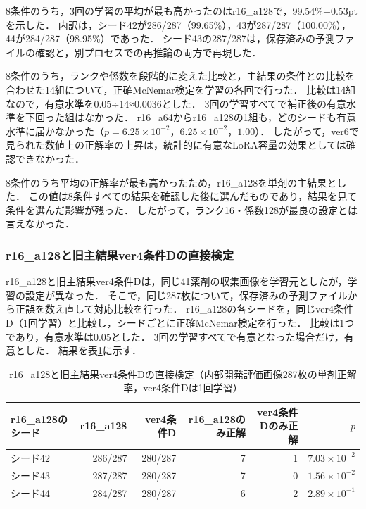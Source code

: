 \documentclass[uplatex,dvipdfmx]{jsarticle}
\begin{document}
8条件のうち，3回の学習の平均が最も高かったのはr16\_a128で，99.54\%$\pm$0.53ptを示した．
内訳は，シード42が286/287（99.65\%），43が287/287（100.00\%），44が284/287（98.95\%）であった．
シード43の287/287は，保存済みの予測ファイルの確認と，別プロセスでの再推論の両方で再現した．

8条件のうち，ランクや係数を段階的に変えた比較と，主結果の条件との比較を合わせた14組について，正確McNemar検定を学習の各回で行った．
比較は14組なので，有意水準を0.05÷14≈0.0036とした．
3回の学習すべてで補正後の有意水準を下回った組はなかった．
r16\_a64からr16\_a128の1組も，どのシードも有意水準に届かなかった（$p=6.25\times10^{-2}$，$6.25\times10^{-2}$，$1.00$）．
したがって，ver6で見られた数値上の正解率の上昇は，統計的に有意なLoRA容量の効果としては確認できなかった．

8条件のうち平均の正解率が最も高かったため，r16\_a128を単剤の主結果とした．
この値は8条件すべての結果を確認した後に選んだものであり，結果を見て条件を選んだ影響が残った．
したがって，ランク16・係数128が最良の設定とは言えなかった．

\subsubsection{r16\_a128と旧主結果ver4条件Dの直接検定}\label{sec:r16a128_condD}

r16\_a128と旧主結果ver4条件Dは，同じ41薬剤の収集画像を学習元としたが，学習の設定が異なった．
そこで，同じ287枚について，保存済みの予測ファイルから正誤を数え直して対応比較を行った．
r16\_a128の各シードを，同じver4条件D（1回学習）と比較し，シードごとに正確McNemar検定を行った．
比較は1つであり，有意水準は0.05とした．
3回の学習すべてで有意となった場合だけ，有意とした．
結果を表\ref{tab:r16a128_condD_test}に示す．

\begin{table}[htbp]
  \centering
  \caption{r16\_a128と旧主結果ver4条件Dの直接検定（内部開発評価画像287枚の単剤正解率，ver4条件Dは1回学習）}
  \label{tab:r16a128_condD_test}
  \small
  \setlength{\tabcolsep}{4pt}
  \begin{tabular}{|l|r|r|r|r|r|}
    \hline
    r16\_a128のシード & r16\_a128 & ver4条件D & r16\_a128のみ正解 & ver4条件Dのみ正解 & $p$ \\ \hline
    シード42 & 286/287 & 280/287 & 7 & 1 & $7.03\times10^{-2}$ \\ \hline
    シード43 & 287/287 & 280/287 & 7 & 0 & $1.56\times10^{-2}$ \\ \hline
    シード44 & 284/287 & 280/287 & 6 & 2 & $2.89\times10^{-1}$ \\ \hline
  \end{tabular}
\end{table}
\end{document}
